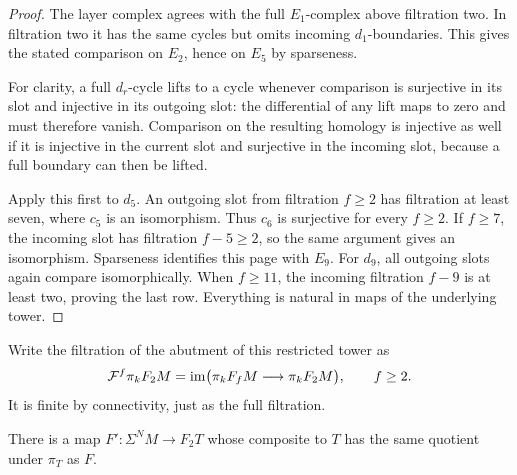 \begin{proof}
The layer complex agrees with the full \(E_1\)-complex
above filtration two.  In filtration two it has the
same cycles but omits incoming \(d_1\)-boundaries.
This gives the stated comparison on \(E_2\), hence on
\(E_5\) by sparseness.

For clarity, a full \(d_r\)-cycle lifts to a cycle
whenever comparison is surjective in its slot and
injective in its outgoing slot: the differential of
any lift maps to zero and must therefore vanish.
Comparison on the resulting homology is injective
as well if it is injective in the current slot and
surjective in the incoming slot, because a full
boundary can then be lifted.

Apply this first to \(d_5\).  An outgoing slot from
filtration \(f\geq2\) has filtration at least seven,
where \(c_5\) is an isomorphism.  Thus \(c_6\) is
surjective for every \(f\geq2\).  If \(f\geq7\), the
incoming slot has filtration \(f-5\geq2\), so the
same argument gives an isomorphism.  Sparseness
identifies this page with \(E_9\).
For \(d_9\), all outgoing slots again compare
isomorphically.  When \(f\geq11\), the incoming
filtration \(f-9\) is at least two, proving the
last row.  Everything is natural in maps of the
underlying tower.
\end{proof}

Write the filtration of the abutment of this restricted
tower as
\[
 \mathcal F^f\pi_kF_2M
   =\operatorname{im}\bigl(\pi_kF_fM\longrightarrow\pi_kF_2M\bigr),
 \qquad f\geq2.
\]
It is finite by connectivity, just as the full filtration.

\begin{proposition}\label{cube:correction}
There is a map \(F':\Sigma^NM\to F_2T\) whose composite
to \(T\) has the same quotient under \(\pi_T\) as \(F\).
\end{proposition}


